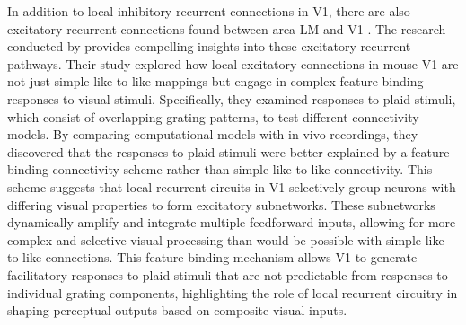 \documentclass[12pt]{article}
\begin{document}
In addition to local inhibitory recurrent connections in V1, there are also excitatory recurrent connections found between area LM and V1 \autocite{muirSpecificExcitatoryConnectivity2017}. The research conducted by \textcite{muirSpecificExcitatoryConnectivity2017} provides compelling insights into these excitatory recurrent pathways. Their study explored how local excitatory connections in mouse V1 are not just simple like-to-like mappings but engage in complex feature-binding responses to visual stimuli. Specifically, they examined responses to plaid stimuli, which consist of overlapping grating patterns, to test different connectivity models. By comparing computational models with in vivo recordings, they discovered that the responses to plaid stimuli were better explained by a feature-binding connectivity scheme rather than simple like-to-like connectivity. This scheme suggests that local recurrent circuits in V1 selectively group neurons with differing visual properties to form excitatory subnetworks. These subnetworks dynamically amplify and integrate multiple feedforward inputs, allowing for more complex and selective visual processing than would be possible with simple like-to-like connections. This feature-binding mechanism allows V1 to generate facilitatory responses to plaid stimuli that are not predictable from responses to individual grating components, highlighting the role of local recurrent circuitry in shaping perceptual outputs based on composite visual inputs. 
\end{document}
